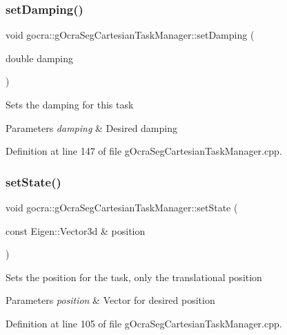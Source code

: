 \subsubsection{\texorpdfstring{set\+Damping()}{setDamping()}}
{\footnotesize\ttfamily void gocra\+::g\+Ocra\+Seg\+Cartesian\+Task\+Manager\+::set\+Damping (\begin{DoxyParamCaption}\item[{double}]{damping }\end{DoxyParamCaption})}

Sets the damping for this task


\begin{DoxyParams}{Parameters}
{\em damping} & Desired damping \\
\hline
\end{DoxyParams}


Definition at line 147 of file g\+Ocra\+Seg\+Cartesian\+Task\+Manager.\+cpp.

\hypertarget{classgocra_1_1gOcraSegCartesianTaskManager_ab10bcbbedc2c7a0fb1d97067e33bd2d7}{}\label{classgocra_1_1gOcraSegCartesianTaskManager_ab10bcbbedc2c7a0fb1d97067e33bd2d7} 
\subsubsection{\texorpdfstring{set\+State()}{setState()}\hspace{0.1cm}{\footnotesize\ttfamily [1/2]}}
{\footnotesize\ttfamily void gocra\+::g\+Ocra\+Seg\+Cartesian\+Task\+Manager\+::set\+State (\begin{DoxyParamCaption}\item[{const Eigen\+::\+Vector3d \&}]{position }\end{DoxyParamCaption})}

Sets the position for the task, only the translational position


\begin{DoxyParams}{Parameters}
{\em position} & Vector for desired position \\
\hline
\end{DoxyParams}


Definition at line 105 of file g\+Ocra\+Seg\+Cartesian\+Task\+Manager.\+cpp.

\hypertarget{classgocra_1_1gOcraSegCartesianTaskManager_a32f465f4fd6dbb427296557d681b736e}{}\label{classgocra_1_1gOcraSegCartesianTaskManager_a32f465f4fd6dbb427296557d681b736e} 

